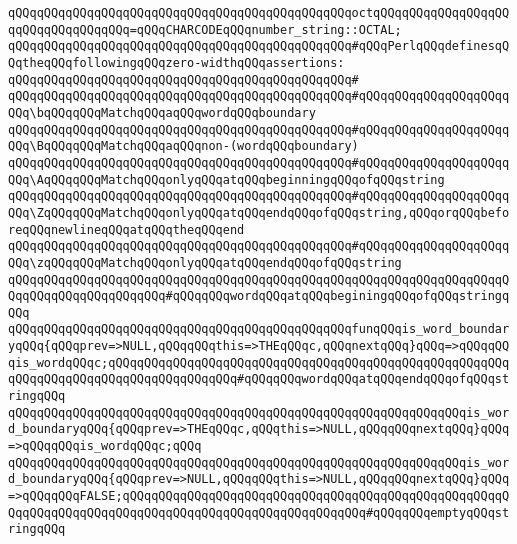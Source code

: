\verb|qQQqqQQqqQQqqQQqqQQqqQQqqQQqqQQqqQQqqQQqqQQqqQQqoctqQQqqQQqqQQqqQQqqQQqqQQqqQQqqQQqqQQq=qQQqCHARCODEqQQqnumber_string::OCTAL;|\newline
\newline
\verb|qQQqqQQqqQQqqQQqqQQqqQQqqQQqqQQqqQQqqQQqqQQqqQQq#qQQqPerlqQQqdefinesqQQqtheqQQqfollowingqQQqzero-widthqQQqassertions:|\newline
\verb|qQQqqQQqqQQqqQQqqQQqqQQqqQQqqQQqqQQqqQQqqQQqqQQq#|\newline
\verb|qQQqqQQqqQQqqQQqqQQqqQQqqQQqqQQqqQQqqQQqqQQqqQQq#qQQqqQQqqQQqqQQqqQQqqQQq\bqQQqqQQqMatchqQQqaqQQqwordqQQqboundary|\newline
\verb|qQQqqQQqqQQqqQQqqQQqqQQqqQQqqQQqqQQqqQQqqQQqqQQq#qQQqqQQqqQQqqQQqqQQqqQQq\BqQQqqQQqMatchqQQqaqQQqnon-(wordqQQqboundary)|\newline
\verb|qQQqqQQqqQQqqQQqqQQqqQQqqQQqqQQqqQQqqQQqqQQqqQQq#qQQqqQQqqQQqqQQqqQQqqQQq\AqQQqqQQqMatchqQQqonlyqQQqatqQQqbeginningqQQqofqQQqstring|\newline
\verb|qQQqqQQqqQQqqQQqqQQqqQQqqQQqqQQqqQQqqQQqqQQqqQQq#qQQqqQQqqQQqqQQqqQQqqQQq\ZqQQqqQQqMatchqQQqonlyqQQqatqQQqendqQQqofqQQqstring,qQQqorqQQqbeforeqQQqnewlineqQQqatqQQqtheqQQqend|\newline
\verb|qQQqqQQqqQQqqQQqqQQqqQQqqQQqqQQqqQQqqQQqqQQqqQQq#qQQqqQQqqQQqqQQqqQQqqQQq\zqQQqqQQqMatchqQQqonlyqQQqatqQQqendqQQqofqQQqstring|\newline
\newline
\verb|qQQqqQQqqQQqqQQqqQQqqQQqqQQqqQQqqQQqqQQqqQQqqQQqqQQqqQQqqQQqqQQqqQQqqQQqqQQqqQQqqQQqqQQqqQQq#qQQqqQQqwordqQQqatqQQqbeginingqQQqofqQQqstringqQQq|\newline
\newline
\verb|qQQqqQQqqQQqqQQqqQQqqQQqqQQqqQQqqQQqqQQqqQQqqQQqfunqQQqis_word_boundaryqQQq{qQQqprev=>NULL,qQQqqQQqthis=>THEqQQqc,qQQqnextqQQq}qQQq=>qQQqqQQqis_wordqQQqc;qQQqqQQqqQQqqQQqqQQqqQQqqQQqqQQqqQQqqQQqqQQqqQQqqQQqqQQqqQQqqQQqqQQqqQQqqQQqqQQqqQQqqQQq#qQQqqQQqwordqQQqatqQQqendqQQqofqQQqstringqQQq|\newline
\verb|qQQqqQQqqQQqqQQqqQQqqQQqqQQqqQQqqQQqqQQqqQQqqQQqqQQqqQQqqQQqqQQqis_word_boundaryqQQq{qQQqprev=>THEqQQqc,qQQqthis=>NULL,qQQqqQQqnextqQQq}qQQq=>qQQqqQQqis_wordqQQqc;qQQq|\newline
\verb|qQQqqQQqqQQqqQQqqQQqqQQqqQQqqQQqqQQqqQQqqQQqqQQqqQQqqQQqqQQqqQQqis_word_boundaryqQQq{qQQqprev=>NULL,qQQqqQQqthis=>NULL,qQQqqQQqnextqQQq}qQQq=>qQQqqQQqFALSE;qQQqqQQqqQQqqQQqqQQqqQQqqQQqqQQqqQQqqQQqqQQqqQQqqQQqqQQqqQQqqQQqqQQqqQQqqQQqqQQqqQQqqQQqqQQqqQQqqQQqqQQq#qQQqqQQqemptyqQQqstringqQQq|\newline

